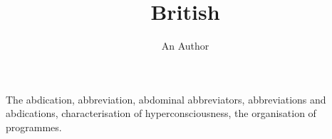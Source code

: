 \documentclass{article}
\title{British}
\author{An Author}
\begin{document}
\maketitle
\begin{minipage}{60pt}
The abdication, abbreviation, abdominal abbreviators, abbreviations and abdications,
characterisation of hyperconsciousness, the organisation of programmes.
\end{minipage}
\end{document}
